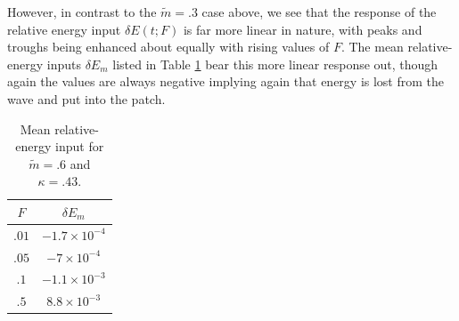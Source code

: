 \documentclass[a4paper,11pt]{article}
\begin{document}
However, in contrast to the $\tilde{m}=.3$ case above, we see that the response of the relative energy input $\delta E(t;F)$ is far more linear in nature, with peaks and troughs being enhanced about equally with rising values of $F$.  The mean relative-energy inputs $\delta E_{m}$ listed in Table \ref{tab:midsolmean} bear this more linear response out, though again the values are always negative implying again that energy is lost from the wave and put into the patch.  
\begin{table}
\centering
\begin{tabular}{c|c}
$F$ & $\delta E_{m}$ \\
\hline
$.01$ & $-1.7\times 10^{-4}$\\
$.05$ & $-7\times 10^{-4}$\\
$.1$ & $-1.1\times 10^{-3}$\\
$.5$ & $8.8\times 10^{-3}$
\end{tabular}
\caption{Mean relative-energy input for $\tilde{m}=.6$ and $\kappa=.43$.}
\label{tab:midsolmean}
\end{table}
\end{document}
